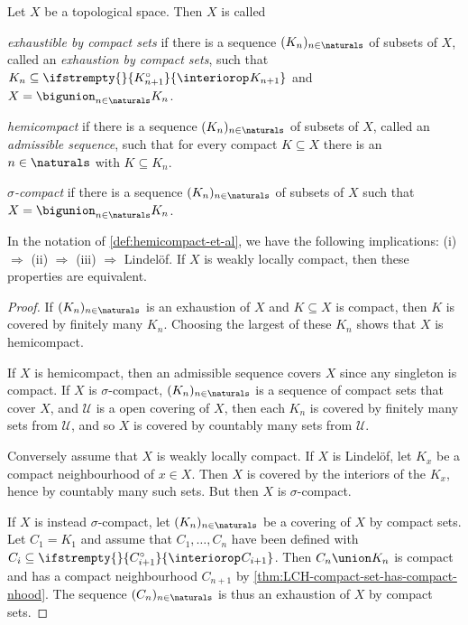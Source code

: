 \documentclass[article, a4paper, 11pt, oneside]{memoir}
\numberwithin{equation}{chapter}
\newcommand{\calU}{\mathcal{U}}
\renewcommand\interior[2][]{%
    \ifstrempty{#1}{%
        #2^{\circ}
    }{%
        \interiorop_{#1}#2
    }%
}
\begin{document}
\begin{definition}
    \label{def:hemicompact-et-al}
    Let $X$ be a topological space. Then $X$ is called
    \begin{enumdef}
        \item \emph{exhaustible by compact sets} if there is a sequence $(K_n)_{n \in \naturals}$ of subsets of $X$, called an \emph{exhaustion by compact sets}, such that $K_n \subseteq \interior{K_{n+1}}$ and $X = \bigunion_{n \in \naturals} K_n$.
        
        \item \emph{hemicompact} if there is a sequence $(K_n)_{n \in \naturals}$ of subsets of $X$, called an \emph{admissible sequence}, such that for every compact $K \subseteq X$ there is an $n \in \naturals$ with $K \subseteq K_n$.

        \item \emph{$\sigma$-compact} if there is a sequence $(K_n)_{n \in \naturals}$ of subsets of $X$ such that $X = \bigunion_{n \in \naturals} K_n$.
    \end{enumdef}
\end{definition}


\begin{proposition}
    In the notation of \cref{def:hemicompact-et-al}, we have the following implications: (i) $\Rightarrow$ (ii) $\Rightarrow$ (iii) $\Rightarrow$ Lindelöf. If $X$ is weakly locally compact, then these properties are equivalent.
\end{proposition}

\begin{proof}
    If $(K_n)_{n \in \naturals}$ is an exhaustion of $X$ and $K \subseteq X$ is compact, then $K$ is covered by finitely many $K_n$. Choosing the largest of these $K_n$ shows that $X$ is hemicompact.

    If $X$ is hemicompact, then an admissible sequence covers $X$ since any singleton is compact. If $X$ is $\sigma$-compact, $(K_n)_{n \in \naturals}$ is a sequence of compact sets that cover $X$, and $\calU$ is a open covering of $X$, then each $K_n$ is covered by finitely many sets from $\calU$, and so $X$ is covered by countably many sets from $\calU$.

    Conversely assume that $X$ is weakly locally compact. If $X$ is Lindelöf, let $K_x$ be a compact neighbourhood of $x \in X$. Then $X$ is covered by the interiors of the $K_x$, hence by countably many such sets. But then $X$ is $\sigma$-compact.

    If $X$ is instead $\sigma$-compact, let $(K_n)_{n \in \naturals}$ be a covering of $X$ by compact sets. Let $C_1 = K_1$ and assume that $C_1, \ldots, C_n$ have been defined with $C_i \subseteq \interior{C_{i+1}}$. Then $C_n \union K_n$ is compact and has a compact neighbourhood $C_{n+1}$ by \cref{thm:LCH-compact-set-has-compact-nhood}. The sequence $(C_n)_{n \in \naturals}$ is thus an exhaustion of $X$ by compact sets.
\end{proof}
\end{document}

